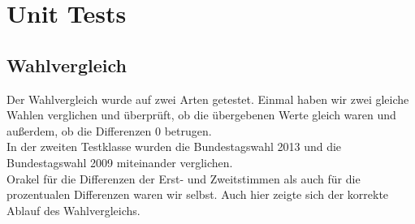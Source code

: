 \documentclass[12pt,a4paper,titlepage]{article}
\begin{document}
\section{Unit Tests}

\subsection{Wahlvergleich}
Der Wahlvergleich wurde auf zwei Arten getestet. Einmal haben wir zwei gleiche Wahlen verglichen und überprüft, ob die übergebenen Werte gleich waren und außerdem, ob die Differenzen 0 betrugen. \\
In der zweiten Testklasse wurden die Bundestagswahl 2013 und die Bundestagswahl 2009 miteinander verglichen.\\
Orakel für die Differenzen der Erst- und Zweitstimmen als auch für die prozentualen Differenzen waren wir selbst. Auch hier zeigte sich der korrekte Ablauf des Wahlvergleichs. \\
\end{document}
